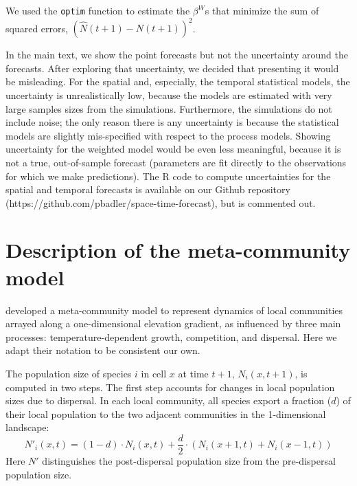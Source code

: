 \documentclass[11pt]{article}
\begin{document}
We used the \texttt{optim} function to estimate the $\beta^W$s that minimize the sum of squared errors, $(\hat{N}(t+1) - N(t+1))^2$.

In the main text, we show the point forecasts but not the uncertainty around the forecasts. After exploring that uncertainty, we decided that presenting it would be misleading. For the spatial and, especially, the temporal statistical models, the uncertainty is unrealistically low, because the models are estimated with very large samples sizes from the simulations. Furthermore, the simulations do not include noise; the only reason there is any uncertainty is because the statistical models are slightly mis-specified with respect to the process models. Showing uncertainty for the weighted model would be even less meaningful, because it is not a true, out-of-sample forecast (parameters are fit directly to the observations for which we make predictions). The R code to compute uncertainties for the spatial and temporal forecasts is available on our Github repository (https://github.com/pbadler/space-time-forecast), but is commented out.

\section{Description of the meta-community model}\label{metacomm}

\cite{alexander_lags_2018} developed a meta-community model to represent dynamics of local communities arrayed along a one-dimensional elevation gradient, as influenced by three main processes: temperature-dependent growth, competition, and dispersal. Here we adapt their notation to be consistent our own.

The population size of species $i$ in cell $x$ at time $t + 1$, $N_{i}(x,t+1)$, is computed in two steps. The first step accounts for changes in local population sizes due to dispersal. In each local community, all species export a fraction ($d$) of their local population to the two adjacent communities in the 1-dimensional landscape:
\begin{equation}
N'_{i}(x,t) = (1-d) \cdot N_{i}(x,t) + \frac{d}{2} \cdot (N_{i}(x+1,t) + N_{i}(x-1,t))
\end{equation}
Here $N'$ distinguishes the post-dispersal population size from the pre-dispersal population size.
\end{document}
